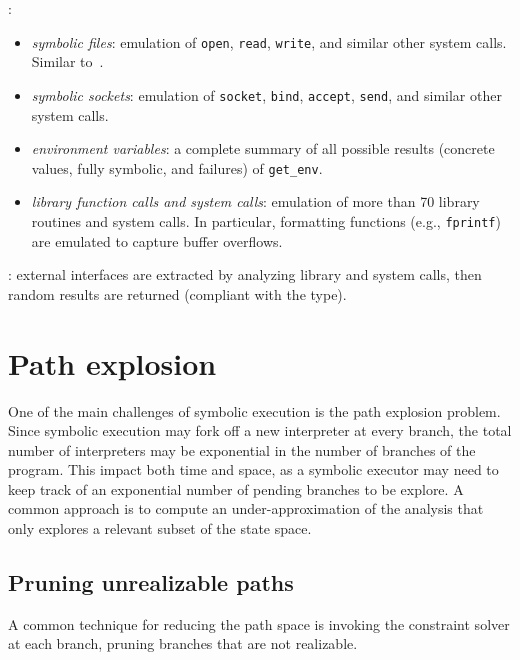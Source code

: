\cite{AEG-NDSS11}:
\begin{itemize}
  \item {\em symbolic files}: emulation of {\tt open}, {\tt read}, {\tt write}, and similar other system calls. Similar to~\cite{KLEE-OSDI08}.
  \item {\em symbolic sockets}: emulation of {\tt socket}, {\tt bind}, {\tt accept}, {\tt send}, and similar other system calls. 
  \item {\em environment variables}: a complete summary of all possible results (concrete values, fully symbolic, and failures) of {\tt get\_env}.
  \item {\em library function calls and system calls}: emulation of more than 70 library routines and system calls. In particular, formatting functions (e.g., {\tt fprintf}) are emulated to capture buffer overflows.
\end{itemize}

\cite{DART-PLDI05}: external interfaces are extracted by analyzing library and system calls, then random results are returned (compliant with the type).


\section{Path explosion}

One of the main challenges of symbolic execution is the path explosion problem. Since symbolic execution may fork off a new interpreter at every branch, the total number of interpreters may be exponential in the number of branches of the program. This impact both time and space, as a symbolic executor may need to keep track of an exponential number of pending branches to be explore. A common approach is to compute an under-approximation of the analysis that only explores a relevant subset of the state space.

\subsection{Pruning unrealizable paths}

A common technique for reducing the path space is invoking the constraint solver at each branch, pruning branches that are not realizable. 

